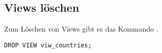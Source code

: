 \subsection{Views löschen}
Zum Löschen von Views gibt es das Kommando .
\begin{lstlisting}[language=ms_sql,caption={Eine View löschen},label=sql08_42]
DROP VIEW viw_countries;
        \end{lstlisting}
